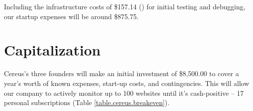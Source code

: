 \noindent
Including the infrastructure costs of \$157.14 () for initial testing and debugging, our startup expenses will be around \$875.75.

\section{Capitalization}

Cereus's three founders will make an initial investment of \$8,500.00 to cover a year's worth of known expenses, start-up costs, and contingencies. This will allow our company to actively monitor up to 100 websites until it's cash-positive -- 17 personal subscriptions (Table \ref{table.cereus.breakeven}).

